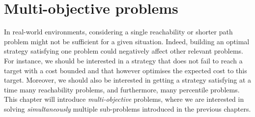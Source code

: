 \chapter{Multi-objective problems}
In real-world environments, considering a single reachability or shorter path problem might not be sufficient for a given situation.
Indeed, building an optimal strategy satisfying one problem could negatively affect other relevant problems.
For instance, we should be interested in a strategy that does not fail to reach a target with a cost bounded and that however optimises the expected cost to this target.
Moreover, we should also be interested in getting a strategy satisfying at a time many reachability problems, and furthermore, many percentile problems. This chapter will introduce \textit{multi-objective} problems, where we are interested in solving \textit{simultaneously} multiple sub-problems introduced in the previous chapters.

